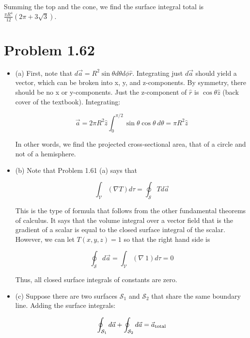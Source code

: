 \documentclass[10pt]{article}
\begin{document}
Summing the top and the cone, we find the surface integral total is $\boxed{\frac{\pi R^4}{12}(2\pi + 3\sqrt{3})}$.

\section{Problem 1.62}

\begin{itemize}

\item (a) First, note that $d\vec{a} = R^2 \sin\theta d\theta d\phi \hat{r}$.  Integrating just $d\vec{a}$ should yield a vector, which can be broken into x, y, and z-components.  By symmetry, there should be no x or y-components.  Just the z-component of $\hat{r}$ is $\cos\theta \hat{z}$ (back cover of the textbook). Integrating:

\begin{equation}
\vec{a} = 2 \pi R^2 \hat{z} \int_{0}^{\pi/2} \sin\theta\cos\theta ~ d\theta = \pi R^2 \hat{z}
\end{equation}

In other words, we find the projected cross-sectional area, that of a circle and not of a hemisphere.

\item (b) Note that Problem 1.61 (a) says that

\begin{equation}
\int_{\mathcal{V}} (\nabla T) d\tau = \oint_{\mathcal{S}} T d\vec{a}
\end{equation}

This is the type of formula that follows from the other fundamental theorems of calculus.  It says that the volume integral over a vector field that is the gradient of a scalar is equal to the closed surface integral of the scalar.  However, we can let $T(x,y,z) = 1$ so that the right hand side is 

\begin{equation}
\oint_{\mathcal{S}} d\vec{a} = \int_{\mathcal{V}} (\nabla ~ 1) d\tau = 0
\end{equation}

Thus, all closed surface integrals of constants are zero.

\item (c)  Suppose there are two surfaces $\mathcal{S}_1$ and $\mathcal{S}_2$ that share the same boundary line.  Adding the surface integrals:

\begin{equation}
\oint_{\mathcal{S}_1} d\vec{a} + \oint_{\mathcal{S}_2} d\vec{a} = \vec{a}_{\rm total}
\end{equation}


\end{itemize}
\end{document}
